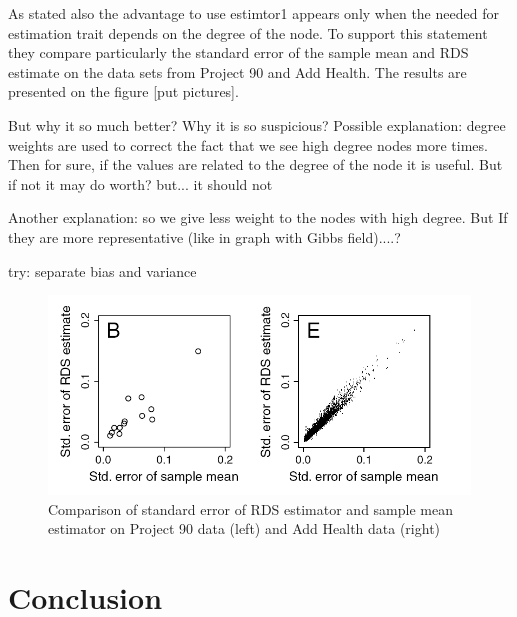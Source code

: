 \documentclass[12pt]{report}
\begin{document}
As stated also \cite{goel2010assessing} the advantage to use estimtor1 appears only when the needed for estimation trait depends on the degree of the node. To support this statement they compare particularly the standard error of the sample mean and RDS estimate on the data sets from Project 90 and Add Health. The results are presented on the figure [put pictures]. 

But why it so much better? Why it is so suspicious?
Possible explanation: degree weights are used to correct the fact that we see high degree nodes more times. Then for sure, if the values are related to the degree of the node it is useful.
But if not it may do worth? but... it should not 

Another explanation: so we give less weight to the nodes with high degree. But If they are more representative (like in graph with Gibbs field)....?


try: separate bias and variance

\begin{figure}[h]
    \centering
    \includegraphics[height=200px]{rdsVSmean}
    \caption{ Comparison of standard error of RDS estimator and sample mean estimator on Project 90 data (left) and Add Health data (right)  \cite{goel2010assessing}}
\end{figure}

\chapter{Conclusion}




\end{document}
